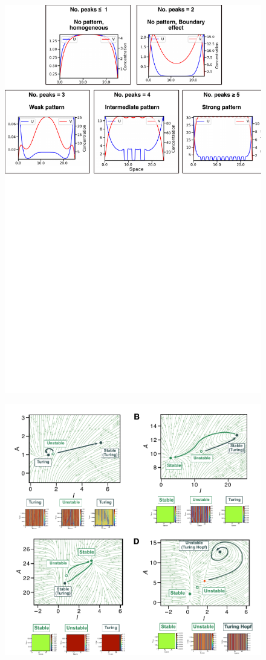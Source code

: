 \begin{figure}[!h]
    \includegraphics[width=1\textwidth]{figures/growth_classification}

    \caption{}
    \label{sup_fig3}
\end{figure}


\begin{figure}[!h]
    \includegraphics[width=1\textwidth]{figures/multistability_leftovers}

    \caption{}
    \label{sup_fig4}
\end{figure}

